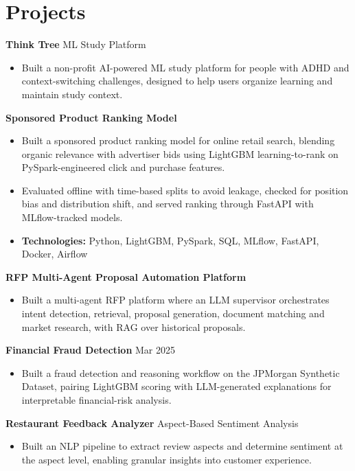 \documentclass[10pt,a4paper]{article}
\begin{document}
\section{Projects}
\textbf{Think Tree} \textbar{} ML Study Platform\par
\begin{itemize}
  \item Built a non-profit AI-powered ML study platform for people with ADHD and context-switching challenges, designed to help users organize learning and maintain study context.
\end{itemize}
\textbf{Sponsored Product Ranking Model}\par
\begin{itemize}
  \item Built a sponsored product ranking model for online retail search, blending organic relevance with advertiser bids using LightGBM learning-to-rank on PySpark-engineered click and purchase features.
  \item Evaluated offline with time-based splits to avoid leakage, checked for position bias and distribution shift, and served ranking through FastAPI with MLflow-tracked models.
  \item \textbf{Technologies:} Python, LightGBM, PySpark, SQL, MLflow, FastAPI, Docker, Airflow
\end{itemize}
\textbf{RFP Multi-Agent Proposal Automation Platform}\par
\begin{itemize}
  \item Built a multi-agent RFP platform where an LLM supervisor orchestrates intent detection, retrieval, proposal generation, document matching and market research, with RAG over historical proposals.
\end{itemize}
\textbf{Financial Fraud Detection} \textbar{} Mar 2025\par
\begin{itemize}
  \item Built a fraud detection and reasoning workflow on the JPMorgan Synthetic Dataset, pairing LightGBM scoring with LLM-generated explanations for interpretable financial-risk analysis.
\end{itemize}
\textbf{Restaurant Feedback Analyzer} \textbar{} Aspect-Based Sentiment Analysis\par
\begin{itemize}
  \item Built an NLP pipeline to extract review aspects and determine sentiment at the aspect level, enabling granular insights into customer experience.
\end{itemize}
\end{document}
